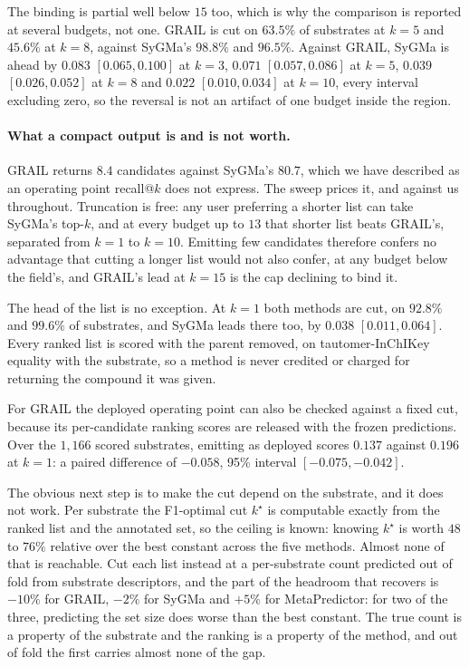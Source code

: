 The binding is partial well below $15$ too, which is why the comparison is reported at
several budgets, not one. GRAIL is cut on $63.5\%$ of substrates at $k=5$ and $45.6\%$ at
$k=8$, against SyGMa's $98.8\%$ and $96.5\%$. Against GRAIL, SyGMa is ahead by $0.083$
$[0.065,0.100]$ at $k=3$, $0.071$ $[0.057,0.086]$ at $k=5$, $0.039$ $[0.026,0.052]$ at $k=8$ and
$0.022$ $[0.010,0.034]$ at $k=10$, every interval excluding zero, so the reversal is not an artifact
of one budget inside the region.

\paragraph{What a compact output is and is not worth.} GRAIL returns $8.4$ candidates against
SyGMa's $80.7$, which we have described as an operating point recall@$k$ does not express. The sweep
prices it, and against us throughout. Truncation is free: any user preferring a shorter list can
take SyGMa's top-$k$, and at every budget up to $13$ that shorter list beats GRAIL's, separated
from $k=1$ to $k=10$. Emitting few candidates therefore confers no advantage that cutting a longer
list would not also confer, at any budget below the field's, and GRAIL's lead at $k=15$ is the cap
declining to bind it.

The head of the list is no exception. At $k=1$ both methods are cut, on $92.8\%$ and $99.6\%$ of
substrates, and SyGMa leads there too, by $0.038$ $[0.011,0.064]$. Every ranked list is scored with
the parent removed, on tautomer-InChIKey equality with the substrate, so a method is never credited
or charged for returning the compound it was given.

For GRAIL the deployed operating point can also be checked against a fixed cut, because
its per-candidate ranking scores are released with the frozen predictions. Over the $1{,}166$ scored
substrates, emitting as deployed scores $0.137$ against $0.196$ at $k=1$: a paired difference of
$-0.058$, 95\% interval $[-0.075,-0.042]$.

The obvious next step is to make the cut depend on the substrate, and it does not work. Per
substrate the F1-optimal cut $k^\star$ is computable exactly from the ranked list and the annotated
set, so the ceiling is known: knowing $k^\star$ is worth $48$ to $76\%$ relative over the best
constant across the five methods. Almost none of that is reachable. Cut each list instead at a
per-substrate count predicted out of fold from substrate descriptors, and the part of the headroom
that recovers is $-10\%$ for GRAIL, $-2\%$ for SyGMa and $+5\%$ for MetaPredictor: for
two of the three, predicting the set size does worse than the best constant. The true count is a
property of the substrate and the ranking is a property of the method, and out of fold the first
carries almost none of the gap.

